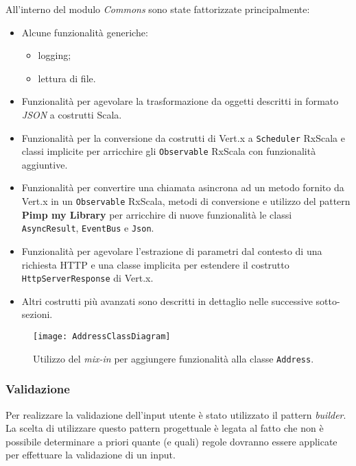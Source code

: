 All'interno del modulo \textit{Commons} sono state fattorizzate principalmente:

\begin{itemize}
%
    \item Alcune funzionalit\`a generiche:
    \begin{itemize}
%
        \item logging;
%
        \item lettura di file.
%
    \end{itemize}
%
    \item Funzionalit\`a per agevolare la trasformazione da oggetti descritti in formato \textit{JSON} a costrutti Scala.
%
    \item Funzionalit\`a per la conversione da costrutti di Vert.x a \texttt{Scheduler} RxScala e classi implicite per arricchire gli \texttt{Observable} RxScala con funzionalit\`a aggiuntive.
%
    \item Funzionalit\`a per convertire una chiamata asincrona ad un metodo fornito da Vert.x in un \texttt{Observable} RxScala, metodi di conversione e utilizzo del pattern  \textbf{Pimp my Library} per arricchire di nuove funzionalit\`a le classi \texttt{AsyncResult}, \texttt{EventBus} e \texttt{Json}.
%
    \item Funzionalit\`a per agevolare l'estrazione di parametri dal contesto di una richiesta HTTP e una classe implicita per estendere il costrutto \texttt{HttpServerResponse} di Vert.x.
%
    \item Altri costrutti pi\`u avanzati sono descritti in dettaglio nelle successive sotto-sezioni.
%
\end{itemize}

\begin{figure}[H]
  \centering
    \texttt{[image: AddressClassDiagram]}
  \caption{Utilizzo del \textit{mix-in} per aggiungere funzionalit\`a alla classe \texttt{Address}.}
\end{figure}

\subsubsection{Validazione}

Per realizzare la validazione dell'input utente è stato utilizzato il pattern \textit{builder}.
%
La scelta di utilizzare questo pattern progettuale \`e legata al fatto che non \`e possibile determinare a priori quante (e quali) regole dovranno essere applicate per effettuare la validazione di un input.

